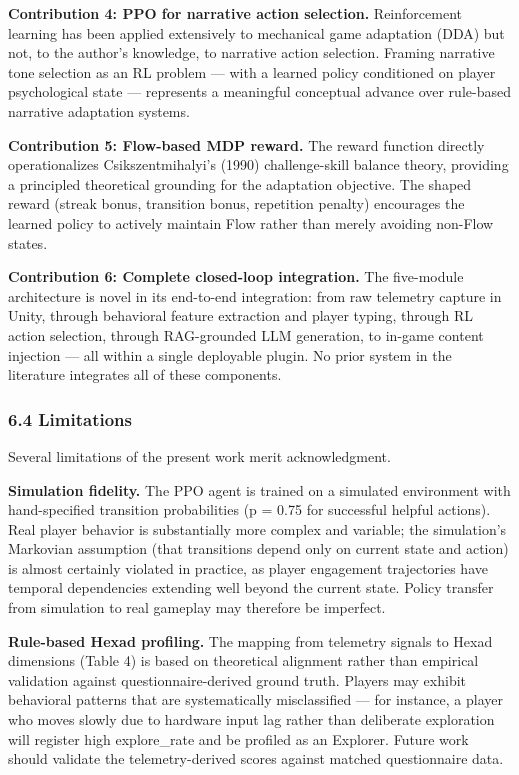 \textbf{Contribution 4: PPO for narrative action selection.}
Reinforcement learning has been applied extensively to mechanical game
adaptation (DDA) but not, to the author's knowledge, to narrative action
selection. Framing narrative tone selection as an RL problem --- with a
learned policy conditioned on player psychological state --- represents
a meaningful conceptual advance over rule-based narrative adaptation
systems.

\textbf{Contribution 5: Flow-based MDP reward.} The reward function
directly operationalizes Csikszentmihalyi's (1990) challenge-skill
balance theory, providing a principled theoretical grounding for the
adaptation objective. The shaped reward (streak bonus, transition bonus,
repetition penalty) encourages the learned policy to actively maintain
Flow rather than merely avoiding non-Flow states.

\textbf{Contribution 6: Complete closed-loop integration.} The
five-module architecture is novel in its end-to-end integration: from
raw telemetry capture in Unity, through behavioral feature extraction
and player typing, through RL action selection, through RAG-grounded LLM
generation, to in-game content injection --- all within a single
deployable plugin. No prior system in the literature integrates all of
these components.

\subsubsection{6.4 Limitations}\label{limitations}

Several limitations of the present work merit acknowledgment.

\textbf{Simulation fidelity.} The PPO agent is trained on a simulated
environment with hand-specified transition probabilities (p = 0.75 for
successful helpful actions). Real player behavior is substantially more
complex and variable; the simulation's Markovian assumption (that
transitions depend only on current state and action) is almost certainly
violated in practice, as player engagement trajectories have temporal
dependencies extending well beyond the current state. Policy transfer
from simulation to real gameplay may therefore be imperfect.

\textbf{Rule-based Hexad profiling.} The mapping from telemetry signals
to Hexad dimensions (Table 4) is based on theoretical alignment rather
than empirical validation against questionnaire-derived ground truth.
Players may exhibit behavioral patterns that are systematically
misclassified --- for instance, a player who moves slowly due to
hardware input lag rather than deliberate exploration will register high
explore\_rate and be profiled as an Explorer. Future work should
validate the telemetry-derived scores against matched questionnaire
data.

